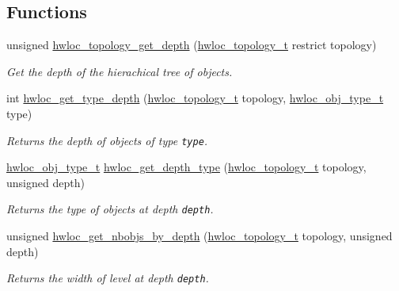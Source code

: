 \subsection*{Functions}
\begin{CompactItemize}
\item 
unsigned \hyperlink{group__hwlocality__information_g3cc2255e237b751a6c8efa8703b3daf5}{hwloc\_\-topology\_\-get\_\-depth} (\hyperlink{group__hwlocality__topology_g9d1e76ee15a7dee158b786c30b6a6e38}{hwloc\_\-topology\_\-t} restrict topology)
\begin{CompactList}\small\item\em Get the depth of the hierachical tree of objects. \item\end{CompactList}\item 
int \hyperlink{group__hwlocality__information_g8bec782e21be313750da70cf7428b374}{hwloc\_\-get\_\-type\_\-depth} (\hyperlink{group__hwlocality__topology_g9d1e76ee15a7dee158b786c30b6a6e38}{hwloc\_\-topology\_\-t} topology, \hyperlink{group__hwlocality__types_gcd37bb612667dc437d66bfb175a8dc55}{hwloc\_\-obj\_\-type\_\-t} type)
\begin{CompactList}\small\item\em Returns the depth of objects of type {\tt type}. \item\end{CompactList}\item 
\hyperlink{group__hwlocality__types_gcd37bb612667dc437d66bfb175a8dc55}{hwloc\_\-obj\_\-type\_\-t} \hyperlink{group__hwlocality__information_g8cc04ad9eb03b0b74d420adf8cc11ad2}{hwloc\_\-get\_\-depth\_\-type} (\hyperlink{group__hwlocality__topology_g9d1e76ee15a7dee158b786c30b6a6e38}{hwloc\_\-topology\_\-t} topology, unsigned depth)
\begin{CompactList}\small\item\em Returns the type of objects at depth {\tt depth}. \item\end{CompactList}\item 
unsigned \hyperlink{group__hwlocality__information_gb17065e3d53455973844568d9f21c72c}{hwloc\_\-get\_\-nbobjs\_\-by\_\-depth} (\hyperlink{group__hwlocality__topology_g9d1e76ee15a7dee158b786c30b6a6e38}{hwloc\_\-topology\_\-t} topology, unsigned depth)
\begin{CompactList}\small\item\em Returns the width of level at depth {\tt depth}. \item\end{CompactList}\item 

\end{CompactItemize}
